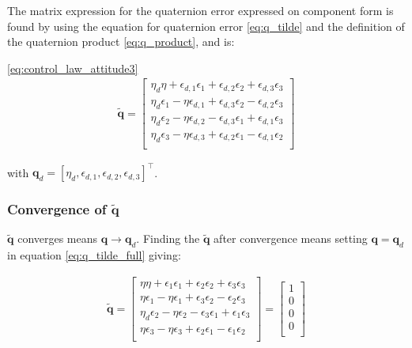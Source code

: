 The matrix expression for the quaternion error expressed on component form is found by using the equation for quaternion error  \eqref{eq:q_tilde} and the definition of the quaternion product \eqref{eq:q_product}, and is:


\eqref{eq:control_law_attitude3}
\begin{equation}
    \begin{aligned}
    \tilde{\boldsymbol{q}}
    =
    \begin{bmatrix}
    \eta_d \eta + \epsilon_{d,1} \epsilon_1 + \epsilon_{d,2} \epsilon_2 + \epsilon_{d,3} \epsilon_3 \\
    \eta_d \epsilon_1 - \eta \epsilon_{d,1} + \epsilon_{d,3} \epsilon_{2} - \epsilon_{d,2} \epsilon_{3} \\
    \eta_d \epsilon_2 - \eta \epsilon_{d,2} - \epsilon_{d,3} \epsilon_{1} + \epsilon_{d,1} \epsilon_{3} \\
    \eta_d \epsilon_3 - \eta \epsilon_{d,3} + \epsilon_{d,2} \epsilon_{1} - \epsilon_{d,1} \epsilon_{2} \\
    \end{bmatrix}
    \label{eq:q_tilde_full}
    \end{aligned}
\end{equation}

with $\mathbf{q}_d = [\eta_d, \epsilon_{d,1}, \epsilon_{d,2}, \epsilon_{d,3}]^\top$.

\subsubsection*{ Convergence of $\tilde{\mathbf{q}}$}

$\tilde{\mathbf{q}}$ converges means $\mathbf{q} \rightarrow \mathbf{q}_d$. Finding the $\tilde{\mathbf{q}}$ after convergence means setting $\mathbf{q} = \mathbf{q}_d$  in equation \eqref{eq:q_tilde_full} giving:

\begin{equation}
    \begin{aligned}
    \tilde{\boldsymbol{q}}
    =
    \begin{bmatrix}
    \eta \eta + \epsilon_{1} \epsilon_1 + \epsilon_{2} \epsilon_2 + \epsilon_{3} \epsilon_3 \\
    \eta \epsilon_1 - \eta \epsilon_{1} + \epsilon_{3} \epsilon_{2} - \epsilon_{2} \epsilon_{3} \\
    \eta_d \epsilon_2 - \eta \epsilon_{2} - \epsilon_{3} \epsilon_{1} + \epsilon_{1} \epsilon_{3} \\
    \eta \epsilon_3 - \eta \epsilon_{3} + \epsilon_{2} \epsilon_{1} - \epsilon_{1} \epsilon_{2} \\
    \end{bmatrix}
    = 
    \begin{bmatrix}
    1 \\
    0\\
    0 \\
    0 \\
    \end{bmatrix}
    \label{eq:q_con}
    \end{aligned}
\end{equation}

